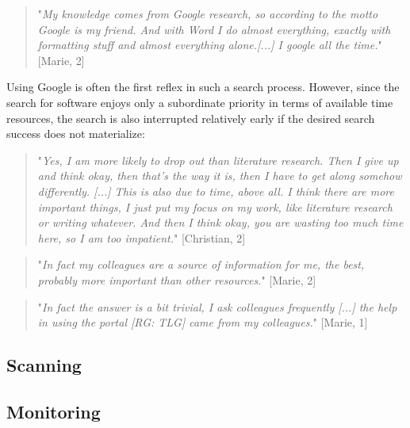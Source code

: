 \documentclass[12pt, a4paper, titlepage, oneside, abstract=true, toc=listof, toc=bibliography]{scrreprt}
\begin{document}
{\begin{quotation}
"\textit{My knowledge comes from Google research, so according to the motto Google is my friend. And with Word I do almost everything, exactly with formatting stuff and almost everything alone.[...] I google all the time.}" [Marie, 2]
\end{quotation}

Using Google is often the first reflex in such a search process. However, since the search for software enjoys only a subordinate priority in terms of available time resources, the search is also interrupted relatively early if the desired search success does not materialize:

\begin{quotation}
"\textit{Yes, I am more likely to drop out than literature research. Then I give up and think okay, then that's the way it is, then I have to get along somehow differently. [...] This is also due to time, above all. I think there are more important things, I just put my focus on my work, like literature research or writing whatever. And then I think okay, you are wasting too much time here, so I am too impatient.}" [Christian, 2]
\end{quotation}






\begin{quotation}
"\textit{In fact my colleagues are a source of information for me, the best, probably more important than other resources.}" [Marie, 2]
\end{quotation}


\begin{quotation}
"\textit{In fact the answer is a bit trivial, I ask colleagues frequently [...]  the help in using the portal [RG: TLG] came from my colleagues.}" [Marie, 1]
\end{quotation}

\subsection{Scanning}
\label{sec:IP_Scanning}


\subsection{Monitoring}
\label{sec:IP_Monitoring}


}
\end{document}
